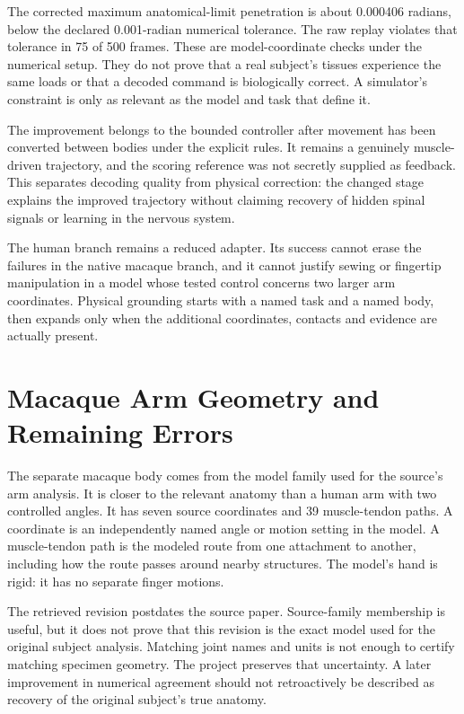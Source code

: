 The corrected maximum anatomical-limit penetration is about 0.000406 radians, below the declared 0.001-radian numerical tolerance. The raw replay violates that tolerance in 75 of 500 frames. These are model-coordinate checks under the numerical setup. They do not prove that a real subject's tissues experience the same loads or that a decoded command is biologically correct. A simulator's constraint is only as relevant as the model and task that define it.

The improvement belongs to the bounded controller after movement has been converted between bodies under the explicit rules. It remains a genuinely muscle-driven trajectory, and the scoring reference was not secretly supplied as feedback. This separates decoding quality from physical correction: the changed stage explains the improved trajectory without claiming recovery of hidden spinal signals or learning in the nervous system.

The human branch remains a reduced adapter. Its success cannot erase the failures in the native macaque branch, and it cannot justify sewing or fingertip manipulation in a model whose tested control concerns two larger arm coordinates. Physical grounding starts with a named task and a named body, then expands only when the additional coordinates, contacts and evidence are actually present.

\section{Macaque Arm Geometry and Remaining Errors}

The separate macaque body comes from the model family used for the source's arm analysis. It is closer to the relevant anatomy than a human arm with two controlled angles. It has seven source coordinates and 39 muscle-tendon paths. A coordinate is an independently named angle or motion setting in the model. A muscle-tendon path is the modeled route from one attachment to another, including how the route passes around nearby structures. The model's hand is rigid: it has no separate finger motions.\cite{chowdhury2020,limblabmodel2026}

The retrieved revision postdates the source paper. Source-family membership is useful, but it does not prove that this revision is the exact model used for the original subject analysis. Matching joint names and units is not enough to certify matching specimen geometry. The project preserves that uncertainty. A later improvement in numerical agreement should not retroactively be described as recovery of the original subject's true anatomy.

